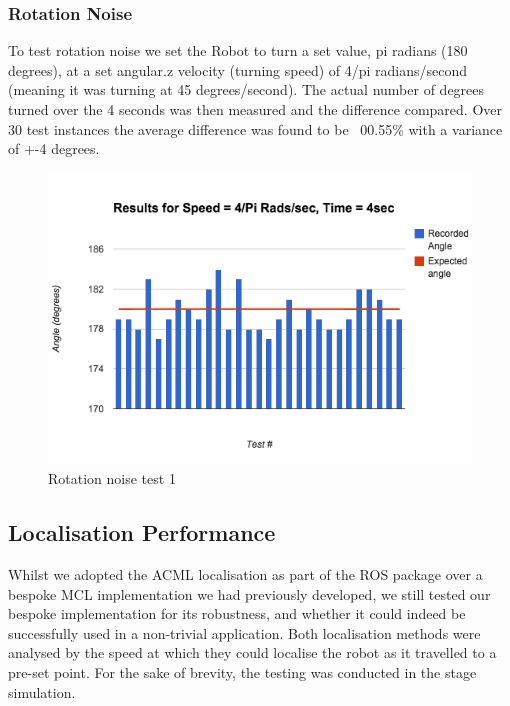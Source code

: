 \documentclass{article}
\begin{document}
	\subsubsection{Rotation Noise}
	To test rotation noise we set the Robot to turn a set value, pi radians (180 degrees), at a set angular.z velocity (turning speed) of 4/pi radians/second (meaning it was turning at 45 degrees/second). The actual number of degrees turned over the 4 seconds was then measured and the difference compared. Over 30 test instances the average difference was found to be ~00.55\% with a variance of +-4 degrees.
	\begin{figure}[H]
	\begin{center}
	\includegraphics[width=0.9\linewidth]{ExperimentalResults7}
	\caption{Rotation noise test 1}
	\end{center}
	\end{figure}
	
	\subsection{Localisation Performance}
	Whilst we adopted the ACML localisation as part of the ROS package over a bespoke MCL implementation we had previously developed, we still tested our bespoke implementation for its robustness, and whether it could indeed be successfully used in a non-trivial application. Both localisation methods were analysed by the speed at which they could localise the robot as it travelled to a pre-set point. For the sake of brevity, the testing was conducted in the stage simulation.
\end{document}
